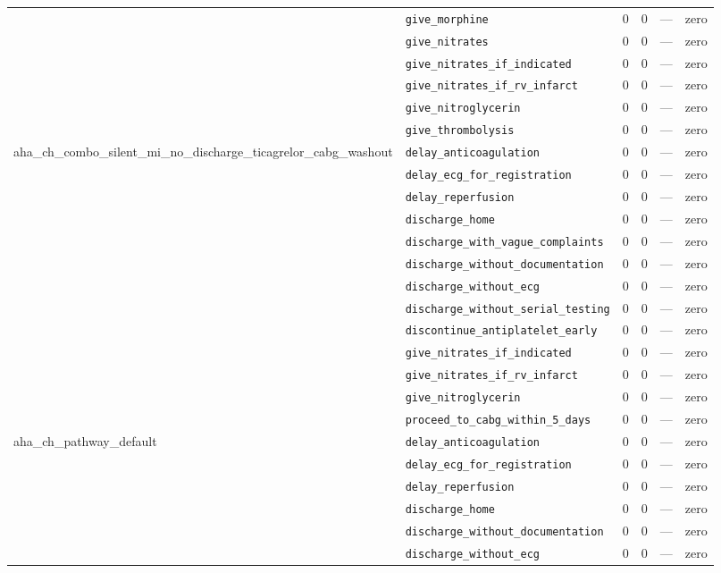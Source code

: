 \begin{table}[ht]
\begin{tabular}{llrrrl}
 & \texttt{give\_morphine} & 0 & 0 & — & zero \\
 & \texttt{give\_nitrates} & 0 & 0 & — & zero \\
 & \texttt{give\_nitrates\_if\_indicated} & 0 & 0 & — & zero \\
 & \texttt{give\_nitrates\_if\_rv\_infarct} & 0 & 0 & — & zero \\
 & \texttt{give\_nitroglycerin} & 0 & 0 & — & zero \\
 & \texttt{give\_thrombolysis} & 0 & 0 & — & zero \\
\midrule
aha\_ch\_combo\_silent\_mi\_no\_discharge\_ticagrelor\_cabg\_washout & \texttt{delay\_anticoagulation} & 0 & 0 & — & zero \\
 & \texttt{delay\_ecg\_for\_registration} & 0 & 0 & — & zero \\
 & \texttt{delay\_reperfusion} & 0 & 0 & — & zero \\
 & \texttt{discharge\_home} & 0 & 0 & — & zero \\
 & \texttt{discharge\_with\_vague\_complaints} & 0 & 0 & — & zero \\
 & \texttt{discharge\_without\_documentation} & 0 & 0 & — & zero \\
 & \texttt{discharge\_without\_ecg} & 0 & 0 & — & zero \\
 & \texttt{discharge\_without\_serial\_testing} & 0 & 0 & — & zero \\
 & \texttt{discontinue\_antiplatelet\_early} & 0 & 0 & — & zero \\
 & \texttt{give\_nitrates\_if\_indicated} & 0 & 0 & — & zero \\
 & \texttt{give\_nitrates\_if\_rv\_infarct} & 0 & 0 & — & zero \\
 & \texttt{give\_nitroglycerin} & 0 & 0 & — & zero \\
 & \texttt{proceed\_to\_cabg\_within\_5\_days} & 0 & 0 & — & zero \\
\midrule
aha\_ch\_pathway\_default & \texttt{delay\_anticoagulation} & 0 & 0 & — & zero \\
 & \texttt{delay\_ecg\_for\_registration} & 0 & 0 & — & zero \\
 & \texttt{delay\_reperfusion} & 0 & 0 & — & zero \\
 & \texttt{discharge\_home} & 0 & 0 & — & zero \\
 & \texttt{discharge\_without\_documentation} & 0 & 0 & — & zero \\
 & \texttt{discharge\_without\_ecg} & 0 & 0 & — & zero \\

\end{tabular}
\end{table}
